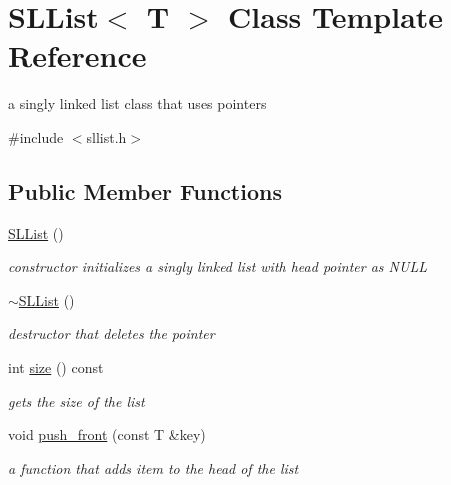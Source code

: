 \hypertarget{classSLList}{}\section{S\+L\+List$<$ T $>$ Class Template Reference}
\label{classSLList}


a singly linked list class that uses pointers  




{\ttfamily \#include $<$sllist.\+h$>$}

\subsection*{Public Member Functions}
\begin{DoxyCompactItemize}
\item 
\mbox{\label{classSLList_aa12f6e3004832c294c2bc35d3427a2ba}} 
\mbox{\hyperlink{classSLList_aa12f6e3004832c294c2bc35d3427a2ba}{S\+L\+List}} ()
\begin{DoxyCompactList}\small\item\em constructor initializes a singly linked list with head pointer as N\+U\+LL \end{DoxyCompactList}\item 
\mbox{\label{classSLList_ac11ef57b87d54d617c5ed324dda92bd0}} 
\mbox{\hyperlink{classSLList_ac11ef57b87d54d617c5ed324dda92bd0}{$\sim$\+S\+L\+List}} ()
\begin{DoxyCompactList}\small\item\em destructor that deletes the pointer \end{DoxyCompactList}\item 
\mbox{\label{classSLList_a3d3edbfd3813b30eec54321555979079}} 
int \mbox{\hyperlink{classSLList_a3d3edbfd3813b30eec54321555979079}{size}} () const
\begin{DoxyCompactList}\small\item\em gets the size of the list \end{DoxyCompactList}\item 
void \mbox{\hyperlink{classSLList_afb451968c186c87b26a00caf30de856c}{push\+\_\+front}} (const T \&key)
\begin{DoxyCompactList}\small\item\em a function that adds item to the head of the list \end{DoxyCompactList}\item 

\end{DoxyCompactItemize}
